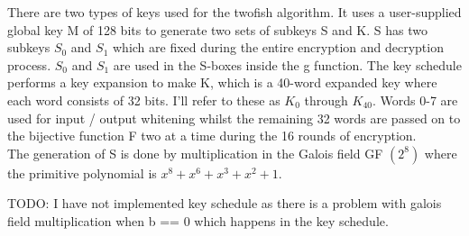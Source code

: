 There are two types of keys used for the twofish algorithm. It uses a user-supplied global key M of 128 bits to generate two sets of subkeys S and K. S has two subkeys $S_0$ and $S_1$ which are fixed during the entire encryption and decryption process. $S_0$ and $S_1$ are used in the S-boxes inside the g function. The key schedule performs a key expansion to make K, which is a 40-word expanded key where each word consists of 32 bits. I'll refer to these as $K_0$ through $K_{40}$. Words 0-7 are used for input / output whitening whilst the remaining 32 words are passed on to the bijective function F two at a time during the 16 rounds of encryption. \\

The generation of S is done by multiplication in the Galois field GF $(2^8)$ where the primitive polynomial is $x^8 + x^6 + x^3 + x^2 + 1$.

TODO: I have not implemented key schedule as there is a problem with galois field multiplication when b == 0 which happens in the key schedule.
